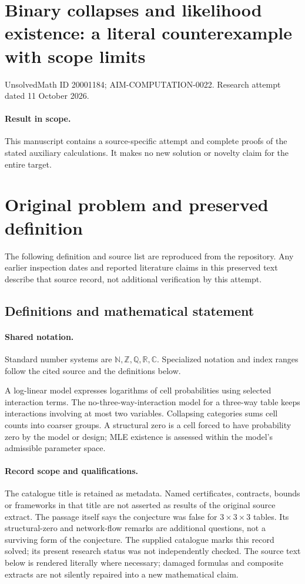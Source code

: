 \documentclass[11pt]{article}
\begin{document}
\section*{Binary collapses and likelihood existence: a literal counterexample with scope limits}
\noindent UnsolvedMath ID 20001184; AIM-COMPUTATION-0022. Research attempt dated 11 October 2026.
\paragraph{Result in scope.}This manuscript contains a source-specific attempt and complete proofs of the stated auxiliary calculations. It makes no new solution or novelty claim for the entire target.
\section{Original problem and preserved definition}
The following definition and source list are reproduced from the repository. Any earlier inspection dates and reported literature claims in this preserved text describe that source record, not additional verification by this attempt.
\subsection{Definitions and mathematical statement}

\paragraph{Shared notation.}Standard number systems are $\mathbb N,\mathbb Z,\mathbb Q,\mathbb R,\mathbb C$. Specialized notation and index ranges follow the cited source and the definitions below.


A log-linear model expresses logarithms of cell probabilities using selected interaction terms. The no-three-way-interaction model for a three-way table keeps interactions involving at most two variables. Collapsing categories sums cell counts into coarser groups. A structural zero is a cell forced to have probability zero by the model or design; MLE existence is assessed within the model's admissible parameter space.
\paragraph{Record scope and qualifications.}
The catalogue title is retained as metadata. Named certificates, contracts, bounds or frameworks in that title are not asserted as results of the original source extract.
The passage itself says the conjecture was false for $3\times3\times3$ tables. Its structural-zero and network-flow remarks are additional questions, not a surviving form of the conjecture. The supplied catalogue marks this record solved; its present research status was not independently checked.
The source text below is rendered literally where necessary; damaged formulas and composite extracts are not silently repaired into a new mathematical claim.
\end{document}

